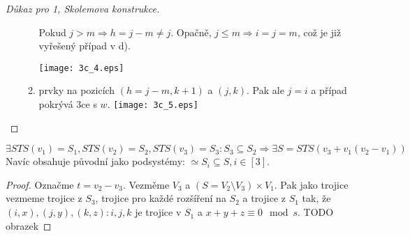 \begin{proof}[Důkaz pro 1, Skolemova konstrukce]
\begin{enumerate}
\begin{enumerate}
					Pokud $j > m \Rightarrow h = j - m \ne j$.
					Opačně, $j \leq m \Rightarrow i = j = m$, což je již vyřešený případ v d).

				\texttt{[image: 3c\_4.eps]}
				\item prvky na pozicích $(h = j - m, k + 1)$ a $(j, k)$.
					Pak ale $j = i$ a případ pokrývá 3ce s $w$.
				\texttt{[image: 3c\_5.eps]}
			\end{enumerate}
	\end{enumerate}

\end{proof}

	\begin{lemma}
		$\exists STS(v_1) = S_1, STS(v_2) = S_2, STS(v_3) = S_3: S_3 \subseteq S_2 \Rightarrow \exists S = STS(v_3 + v_1(v_2 - v_1)) $
		Navíc obsahuje původní jako podsystémy: $ \simeq S_i \subseteq S, i \in [3]$.
	\end{lemma}
	\begin{proof}
		Označme $t = v_2 - v_3$.
    		Vezměme $V_3$ a $(S=V_2\setminus V_3)\times V_1$.
    		Pak jako trojice vezmeme trojice z $S_3$, trojice pro každé rozšíření na $S_2$ a trojice z $S_1$ tak, že $(i,x),(j,y),(k,z): i,j,k$ je trojice v $S_1$ a $x+y+z\equiv 0\mod s$.
    		TODO obrazek
	\end{proof}


